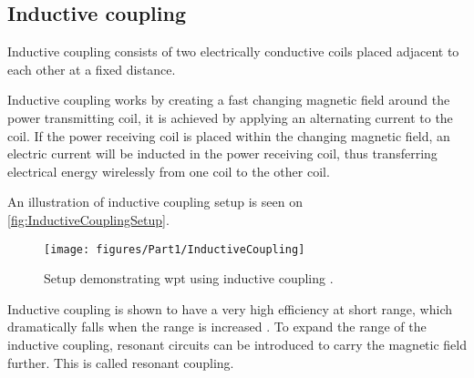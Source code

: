 \subsection{Inductive coupling} \label{sec:InductiveCoupling}
Inductive coupling consists of two electrically conductive coils placed adjacent to each other at a fixed distance. 

Inductive coupling works by creating a fast changing magnetic field around the power transmitting coil, it is achieved by applying an alternating current to the coil. 
If the power receiving coil is placed within the changing magnetic field, an electric current will be inducted in the power receiving coil, thus transferring electrical energy wirelessly from one coil to the other coil. 

An illustration of inductive coupling setup is seen on \autoref{fig:InductiveCouplingSetup}. 
\begin{figure} [h]
	\centering
	\texttt{[image: figures/Part1/InductiveCoupling]}
	\caption{Setup demonstrating \gls{wpt} using inductive coupling \citep{website:inductive_coupling}.}
	\label{fig:InductiveCouplingSetup}
\end{figure}

Inductive coupling is shown to have a very high efficiency at short range, which dramatically falls when the range is increased \citep{website:Analysis_of_Wireless_Power_Transmission}. To expand the range of the inductive coupling, resonant circuits can be introduced to carry the magnetic field further. This is called resonant coupling.
%
%
%

